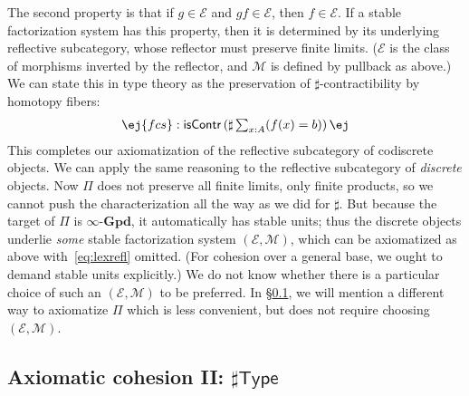 \documentclass[copyright]{eptcs}
\makeatletter
\newcommand{\type}{\ensuremath{\mathsf{Type}}\xspace}
\newcommand{\ig}{\ensuremath{\infty\text{-}\mathbf{Gpd}}\xspace}
\newcommand{\io}{\ensuremath{(\infty,1)}}
\newcommand{\E}{\ensuremath{\mathcal{E}}\xspace}
\newcommand{\M}{\ensuremath{\mathcal{M}}\xspace}
\def\jd#1{\@jd#1\ej}
\def\@jd#1|-#2\ej{\@@jd#1,,\;\vdash\;\left(#2\right)}
\def\@@jd#1,{\@ifmtarg{#1}{\let\next=\relax}{\left(#1\right)\let\next=\@@@jd}\next}
\def\@@@jd#1,{\@ifmtarg{#1}{\let\next=\relax}{,\,\left(#1\right)\let\next=\@@@jd}\next}
\makeatother
\begin{document}
The second property is that if $g\in\E$ and $g f \in\E$, then $f\in \E$.
If a stable factorization system has this property, then it is determined by its underlying reflective subcategory, whose reflector must preserve finite limits.
(\E is the class of morphisms inverted by the reflector, and \M is defined by pullback as above.)
We can state this in type theory as the preservation of $\sharp$-contractibility by homotopy fibers:
\begin{multline}\label{eq:lexrefl}
  \jd{\mathsf{acs}:\mathsf{isContr}(\sharp A), \mathsf{bcs}:\mathsf{isContr}(\sharp B),
    f:A\to B, b:B |- \mathsf{fcs} : \mathsf{isContr}\left(\sharp \textstyle\sum_{x:A}(f(x)=b)\right)}
\end{multline}
This completes our axiomatization of the reflective subcategory of codiscrete objects.
%
We can apply the same reasoning to the reflective subcategory of \emph{discrete} objects.
Now $\Pi$ does not preserve all finite limits, only finite products, so we cannot push the characterization all the way as we did for $\sharp$.
But because the target of $\Pi$ is \ig, it automatically has stable units; thus the discrete objects underlie \emph{some} stable factorization system $(\E,\M)$, which can be axiomatized as above with~\eqref{eq:lexrefl} omitted.
(For cohesion over a general base, we ought to demand stable units explicitly.)
%
We do not know whether there is a particular choice of such an $(\E,\M)$ to be preferred.
In \S\ref{sec:axiomatic-cohesion-ii}, we will mention a different way to axiomatize $\Pi$ which is less convenient, but does not require choosing $(\E,\M)$.


\subsection{Axiomatic cohesion II: $\sharp\type$}
\label{sec:axiomatic-cohesion-ii}
\end{document}

